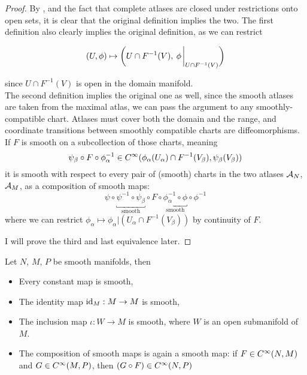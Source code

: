 \documentclass[../main-manifolds.tex]{subfiles}
\begin{document}
\begin{proof}
    By , and the fact that complete atlases are closed under restrictions onto open sets, it is clear that the original definition implies the two. The first definition also clearly implies the original definition, as we can restrict 
    
    \[(U,\phi)\mapsto \biggl(U\cap F^{-1}(V),\: \phi\eval_{U\cap F^{-1}(V)}\biggr)\]
    
    since $U\cap F^{-1}(V)$ is open in the domain manifold.\\

    The second definition implies the original one as well, since the smooth atlases are taken from the maximal atlas, we can pass the argument to any smoothly-compatible chart. Atlases must cover both the domain and the range, and coordinate transitions between smoothly compatible charts are diffeomorphisms. If $F$ is smooth on a subcollection of those charts, meaning
    \[
        \psi_\beta\circ F\circ\phi_\alpha^{-1}\in \cinf[\phi_\alpha(U_\alpha)\cap F^{-1}(V_\beta),\psi_\beta(V_\beta)]
    \]
    it is smooth with respect to every pair of (smooth) charts in the two atlases $\mathcal{A}_{N}$, $\mathcal{A}_{M}$, as a composition of smooth maps:
    \[
        \psi\circ \underbracket{\psi^{-1}\circ \psi_\beta}_{\text{smooth}}\circ F\circ\underbracket{\phi_\alpha^{-1}\circ \phi}_{\text{smooth}}\circ\phi^{-1}
    \]
    where we can restrict $\phi_\alpha\mapsto \phi_\alpha|(U_\alpha\cap F^{-1}(V_\beta))$ by continuity of $F$.

    I will prove the third and last equivalence later.
\end{proof}
\begin{wts}\label{lee-chp2:sources-of-smooth-maps}
    Let $N$, $M$, $P$ be smooth manifolds, then
    \begin{itemize}
        \item Every constant map is smooth,
        \item The identity map $\operatorname{id}_{M}:M\to M$ is smooth,
        \item The inclusion map $\iota: W\to M$ is smooth, where $W$ is an open submanifold of $M$.
        \item The composition of smooth maps is again a smooth map: if $F\in \cinf[N,M]$ and $G\in \cinf[M,P]$, then $(G\circ F)\in\cinf[N,P]$
    \end{itemize}
\end{wts}
\end{document}

